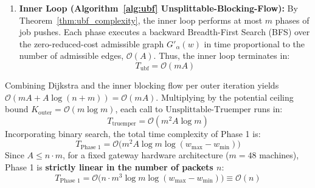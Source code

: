 \documentclass{article}
\begin{document}
\begin{enumerate}
    \item \textbf{Inner Loop (Algorithm~\ref{alg:ubf} Unsplittable-Blocking-Flow):}
    By Theorem~\ref{thm:ubf_complexity}, the inner loop performs at most $m$ phases of job pushes. Each phase executes a backward Breadth-First Search (BFS) over the zero-reduced-cost admissible graph $G'_\alpha(w)$ in time proportional to the number of admissible edges, $\mathcal{O}(A)$. Thus, the inner loop terminates in:
    \begin{equation}
    T_{\text{ubf}} = \mathcal{O}(m A)
    \end{equation}
\end{enumerate}

Combining Dijkstra and the inner blocking flow per outer iteration yields $\mathcal{O}(mA + A \log(n+m)) = \mathcal{O}(mA)$. Multiplying by the potential ceiling bound $K_{\text{outer}} = \mathcal{O}(m \log m)$, each call to $\text{Unsplittable-Truemper}$ runs in:
\begin{equation}
T_{\text{truemper}} = \mathcal{O}(m^2 A \log m)
\end{equation}
Incorporating binary search, the total time complexity of Phase 1 is:
\begin{equation}
\label{eq:phase1_complexity}
T_{\text{Phase 1}} = \mathcal{O}\Big(m^2 A \log m \log(w_{\max} - w_{\min})\Big)
\end{equation}
Since $A \le n \cdot m$, for a fixed gateway hardware architecture ($m = 48$ machines), Phase 1 is \textbf{strictly linear in the number of packets $n$}:
\begin{equation}
T_{\text{Phase 1}} = \mathcal{O}\Big(n \cdot m^3 \log m \log(w_{\max} - w_{\min})\Big) \equiv \mathcal{O}(n)
\end{equation}
\end{document}
